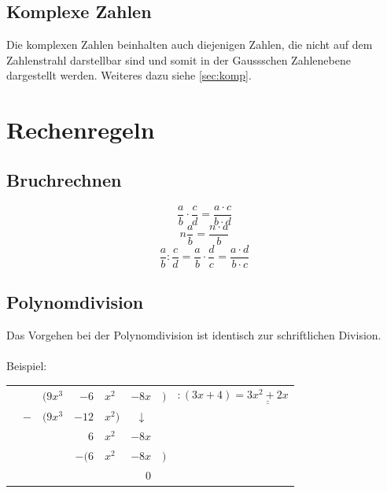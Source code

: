 \subsection{Komplexe Zahlen}
Die komplexen Zahlen beinhalten auch diejenigen Zahlen, die nicht auf dem 
Zahlenstrahl darstellbar sind und somit in der Gaussschen Zahlenebene 
dargestellt werden. Weiteres dazu siehe \ref{sec:komp}. 

\section{Rechenregeln}

\subsection{Bruchrechnen}
\[ \boxed{\frac{a}{b} \cdot \frac{c}{d} = \frac{a \cdot c}{b \cdot d}} \]
\[ \boxed{n \frac{a}{b} = \frac{n \cdot a}{b}} \]
\[ \boxed{\frac{a}{b} : \frac{c}{d} = \frac{a}{b} \cdot \frac{d}{c} 
= \frac{a \cdot d}{b \cdot c}} \]

\subsection{Polynomdivision}
Das Vorgehen bei der Polynomdivision ist identisch zur schriftlichen 
Division. \\\\
Beispiel: 

\begin{tabular}{|r@{}r@{}r@{}r@{}l@{}r@{}r@{}l|}
\hline
\rule{0pt}{12pt}&&$(9x^3 $&$- 6$&$x^2 $&$- 8x$&$)$&$:(3x + 4) 
= \underline{\underline{3x^2 + 2x}}$\\
&$-$&$(9x^3 $&$- 12$&$x^2)$&$\downarrow\,\,$&&\\
\cline{2-5}\rule{0pt}{12pt}&&&$6$&$x^2 $&$- 8x$&&\\
&&&$-(6$&$x^2 $&$- 8x$&$)$&\\
\cline{4-7}\rule{0pt}{12pt}&&&&&$0$&&\\
\hline
\end{tabular}


